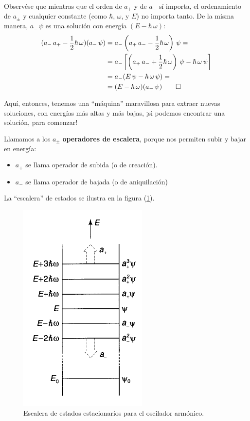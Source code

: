 Observése que mientras que el orden de $a_{+}$ y de $a_{-}$ sí importa, el ordenamiento de $a_{\pm}$ y cualquier constante (como $\hbar$, $\omega$, y $E$) no importa tanto. De la misma manera, $a_{-} \, \psi$ es una solución con energía $(E - \hbar \, \omega)$:
\begin{align*}
(a_{-} \, a_{+} - \dfrac{1}{2} \hbar \, \omega) (a_{-} \, \psi) &= a_{-} \left( a_{+} \, a_{-} - \dfrac{1}{2} \hbar \, \omega \right) \, \psi = \\
&= a_{-} \left[ \left( a_{+} \, a_{-} + \dfrac{1}{2} \hbar \, \omega \right) \, \psi - \hbar \, \omega \, \psi \right] \\
&= a_{-} (E \, \psi - \hbar \, \omega \, \psi) = \\
&= (E - \hbar \, \omega) (a_{-} \, \psi) \qed
\end{align*}

Aquí, entonces, tenemos una \enquote{máquina} maravillosa para extraer nuevas soluciones, con energías más altas y más bajas, ¡si podemos encontrar una solución, para comenzar!
\par
Llamamos a los $a_{\pm}$ \textbf{operadores de escalera}, porque nos permiten subir y bajar en energía:
\begin{itemize}
\item $a_{+}$ se llama operador de subida (o de creación).
\item $a_{-}$ se llama operador de bajada (o de aniquilación) 
\end{itemize}

La \enquote{escalera} de estados se ilustra en la figura (\ref{fig:figura_002}).
\begin{figure}[H]
    \centering
    \includegraphics[scale=0.7]{Imagenes/Operadores_escalera.png}
    \caption{Escalera de estados estacionarios para el oscilador armónico.}
    \label{fig:figura_002}
\end{figure}

